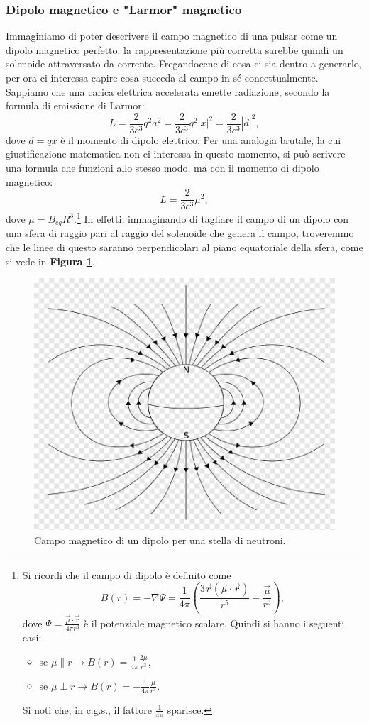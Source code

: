 \subsubsection{Dipolo magnetico e "Larmor" magnetico}
Immaginiamo di poter descrivere il campo magnetico di una pulsar come un dipolo magnetico perfetto: la rappresentazione più corretta sarebbe quindi un solenoide attraversato da corrente.
Fregandocene di cosa ci sia dentro a generarlo, per ora ci interessa capire cosa succeda al campo in sé concettualmente.
Sappiamo che una carica elettrica accelerata emette radiazione, secondo la formula di emissione di Larmor:
\begin{equation}
    L=\frac{2}{3c^3}q^2a^2=\frac{2}{3c^3}q^2|\ddot{x}|^2=\frac{2}{3c^3}|\ddot{d}|^2,    
\end{equation}
dove $d=qx$ è il momento di dipolo elettrico.
Per una analogia brutale, la cui giustificazione matematica non ci interessa in questo momento, si può scrivere una formula che funzioni allo stesso modo, ma con il momento di dipolo magnetico:
\begin{equation}
    L=\frac{2}{3c^3}\ddot{\mu}^2,
\end{equation}
dove $\mu = B_{eq}R^3$.\footnote{Si ricordi che il campo di dipolo è definito come
\begin{equation}
    B(r)=-\nabla\Psi=\frac{1}{4\pi}\left( \frac{3\vec{r}(\vec{\mu}\cdot\vec{r})}{r^5} - \frac{\vec{\mu}}{r^3}\right),
\end{equation}
dove $\Psi=\frac{\vec{\mu}\cdot\vec{r}}{4\pi r^3} $ è il potenziale magnetico scalare. 
Quindi si hanno i seguenti casi:
\begin{itemize}
    \item se $\mu\parallel r\xrightarrow{}B(r)=\frac{1}{4\pi}\frac{2\mu}{r^3}$,
    \item se $\mu\perp r\xrightarrow{}B(r)=-\frac{1}{4\pi}\frac{\mu}{r^3}$.
\end{itemize}
Si noti che, in c.g.s., il fattore $\frac{1}{4\pi}$ sparisce.
}
In effetti, immaginando di tagliare il campo di un dipolo con una sfera di raggio pari al raggio del solenoide che genera il campo, troveremmo che le linee di questo saranno perpendicolari al piano equatoriale della sfera, come si vede in \textbf{Figura \ref{fig:momento di dipolo ns}}.
\begin{figure}[h!]
    \centering
    \includegraphics[width=0.4\linewidth]{Immagini/dipole_moment.png}
    \caption{Campo magnetico di un dipolo per una stella di neutroni.}
    \label{fig:momento di dipolo ns}
\end{figure}
